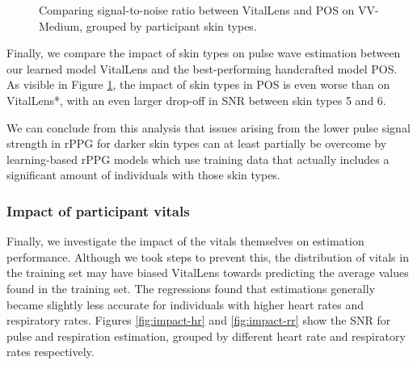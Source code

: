 \documentclass{article}
\begin{document}
\begin{figure}[h!]
  \centering
  \caption{Comparing signal-to-noise ratio between VitalLens and POS on VV-Medium, grouped by participant skin types.}
  \label{fig:impact-skin-type-comparison-pos}
\end{figure}

Finally, we compare the impact of skin types on pulse wave estimation between our learned model VitalLens and the best-performing handcrafted model POS.
As visible in Figure \ref{fig:impact-skin-type-comparison-pos}, the impact of skin types in POS is even worse than on VitalLens*, with an even larger drop-off in SNR between skin types 5 and 6.

We can conclude from this analysis that issues arising from the lower pulse signal strength in rPPG for darker skin types can at least partially be overcome by learning-based rPPG models which use training data that actually includes a significant amount of individuals with those skin types.

\subsubsection{Impact of participant vitals}

Finally, we investigate the impact of the vitals themselves on estimation performance.
Although we took steps to prevent this, the distribution of vitals in the training set may have biased VitalLens towards predicting the average values found in the training set.
The regressions found that estimations generally became slightly less accurate for individuals with higher heart rates and respiratory rates.
Figures \ref{fig:impact-hr} and \ref{fig:impact-rr} show the SNR for pulse and respiration estimation, grouped by different heart rate and respiratory rates respectively.
\end{document}
